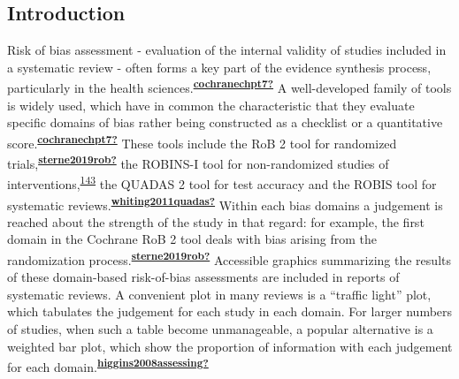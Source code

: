 \documentclass[a4paper, twoside]{templates/ociamthesis}
\begin{document}
\hypertarget{introduction-3}{%
\subsection{Introduction}\label{introduction-3}}

Risk of bias assessment - evaluation of the internal validity of studies included in a systematic review - often forms a key part of the evidence synthesis process, particularly in the health sciences.\textsuperscript{\protect\hyperlink{ref-cochranechpt7}{\textbf{cochranechpt7?}}} A well-developed family of tools is widely used, which have in common the characteristic that they evaluate specific domains of bias rather being constructed as a checklist or a quantitative score.\textsuperscript{\protect\hyperlink{ref-cochranechpt7}{\textbf{cochranechpt7?}}} These tools include the RoB 2 tool for randomized trials,\textsuperscript{\protect\hyperlink{ref-sterne2019rob}{\textbf{sterne2019rob?}}} the ROBINS-I tool for non-randomized studies of interventions,\textsuperscript{\protect\hyperlink{ref-sterne2016}{143}} the QUADAS 2 tool for test accuracy and the ROBIS tool for systematic reviews.\textsuperscript{\protect\hyperlink{ref-whiting2011quadas}{\textbf{whiting2011quadas?}}} Within each bias domains a judgement is reached about the strength of the study in that regard: for example, the first domain in the Cochrane RoB 2 tool deals with bias arising from the randomization process.\textsuperscript{\protect\hyperlink{ref-sterne2019rob}{\textbf{sterne2019rob?}}} Accessible graphics summarizing the results of these domain-based risk-of-bias assessments are included in reports of systematic reviews. A convenient plot in many reviews is a ``traffic light'' plot, which tabulates the judgement for each study in each domain. For larger numbers of studies, when such a table become unmanageable, a popular alternative is a weighted bar plot, which show the proportion of information with each judgement for each domain.\textsuperscript{\protect\hyperlink{ref-higgins2008assessing}{\textbf{higgins2008assessing?}}}
\end{document}
